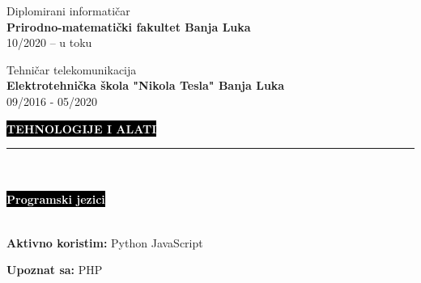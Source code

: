 \documentclass[9pt]{developercv} %
\begin{document}
    {\huge Diplomirani informatičar \smallskip}\\
    {\textbf{Prirodno-matematički fakultet Banja Luka}}\\
    {\faCalendarCheckO \space}{10/2020 -- u toku}\\
    
    \vspace{0.3cm}
    
	{\huge Tehničar telekomunikacija \smallskip}\\
    {\textbf{Elektrotehnička škola "Nikola Tesla" Banja Luka}}\\
    {\faCalendarCheckO \space}{09/2016 - 05/2020}\\

\vspace{1cm}




\colorbox{black}{{\textcolor{white}{\textbf{\MakeUppercase{Tehnologije i alati}}}}}
\par\noindent\rule{\textwidth}{2px}\\\\
\colorbox{black}{{\textcolor{white}{\textbf{Programski jezici}}}}\smallskip\\\\
\begin{minipage}[t]{0.5\textwidth}
	\vspace{-\baselineskip}
	
	\textbf{Aktivno koristim:} \hspace{10} {Python} \hspace{10} {JavaScript}\smallskip
\end{minipage}
\hfill
\begin{minipage}[t]{0.5\textwidth}
	\vspace{-\baselineskip}
	
	\textbf{Upoznat sa:}  \hspace{10} {PHP}
\end{minipage}

\vspace{1cm}
\end{document}
